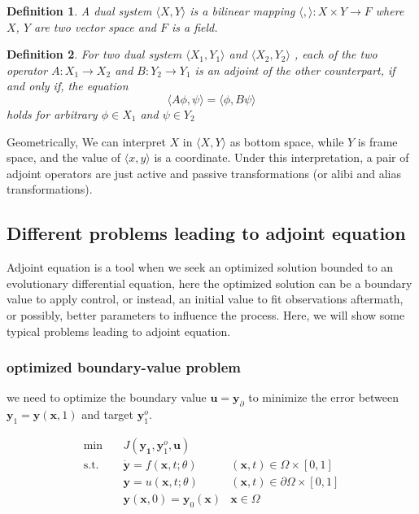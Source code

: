 \documentclass{article}
\newtheorem{definition}{Definition}
\begin{document}
\begin{definition}
\label{d0}
A dual system $ \langle X, Y \rangle $ is a bilinear mapping $ \langle , \rangle : X \times Y \to F $ where $X$, $Y$ are two vector space and $ F $ is a field.
\end{definition}

\begin{definition}
\label{d1}
For two dual system $ \langle X_1, Y_1 \rangle $ and $ \langle X_2, Y_2 \rangle $ , each of the two operator $ A : X_1 \to X_2$ and $ B : Y_2 \to Y_1 $ is an adjoint of the other counterpart,
if and only if, the equation $$ \langle A \phi, \psi \rangle = \langle \phi, B \psi \rangle $$ holds for arbitrary $ \phi \in X_1 $ and $ \psi \in Y_2 $
\end{definition}

Geometrically, We can interpret $ X $ in $ \langle X, Y \rangle $ as bottom space, while $ Y $ is frame space, and the value of $ \langle x, y \rangle $ is a coordinate.
Under this interpretation, a pair of adjoint operators are just active and passive transformations (or alibi and alias transformations)\cite{wiki:aptrans}.

\subsection{Different problems leading to adjoint equation}

Adjoint equation is a tool when we seek an optimized solution bounded to an evolutionary differential equation, here the optimized solution can be a boundary value to apply control, or instead, an initial value to fit observations aftermath, or possibly, better parameters to influence the process.
Here, we will show some typical problems leading to adjoint equation.

\subsubsection{optimized boundary-value problem}

we need to optimize the boundary value $ \mathbf{u} = \mathbf{y}_{\partial} $ to minimize the error between $ \mathbf{y}_1 = \mathbf{y}(\mathbf{x}, 1)$ and target $ \mathbf{y}_1^o $.

$$
\begin{array}{rcll}
\min &~& J(\mathbf{y_1}, \mathbf{y}_1^o, \mathbf{u}) & \\
\mathrm{s.t.} &~& \dot{\mathbf{y}} = f(\mathbf{x}, t; \theta) & (\mathbf{x}, t) \in \Omega \times [0, 1] \\
&~& \mathbf{y} = u(\mathbf{x}, t; \theta) & (\mathbf{x}, t) \in \partial \Omega \times [0, 1] \\
&~& \mathbf{y}(\mathbf{x}, 0) = \mathbf{y}_0(\mathbf{x}) & \mathbf{x} \in \Omega
\end{array}
$$
\end{document}
